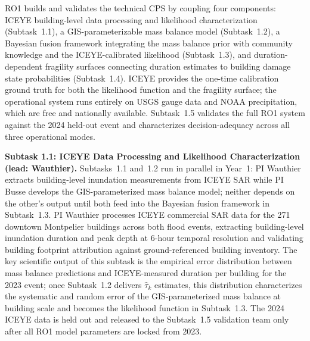 \documentclass[11pt]{article}
\begin{document}
RO1 builds and validates the technical CPS by coupling four components: ICEYE
building-level data processing and likelihood characterization (Subtask~1.1), a
GIS-parameterizable mass balance model (Subtask~1.2), a Bayesian fusion framework
integrating the mass balance prior with community knowledge and the ICEYE-calibrated
likelihood (Subtask~1.3), and duration-dependent fragility surfaces connecting
duration estimates to building damage state probabilities (Subtask~1.4).
ICEYE provides the one-time calibration ground truth for both the likelihood function
and the fragility surface; the operational system runs entirely on USGS gauge data
and NOAA precipitation, which are free and nationally available.
Subtask~1.5 validates the full RO1 system against the 2024 held-out event and
characterizes decision-adequacy across all three operational modes.

\textbf{Subtask 1.1: ICEYE Data Processing and Likelihood Characterization
(lead: Wauthier).}
Subtasks~1.1 and~1.2 run in parallel in Year~1: PI Wauthier extracts
building-level inundation measurements from ICEYE SAR while PI Busse develops
the GIS-parameterized mass balance model; neither depends on the other's output
until both feed into the Bayesian fusion framework in Subtask~1.3.
PI Wauthier processes ICEYE commercial SAR data for the 271 downtown Montpelier
buildings across both flood events, extracting building-level inundation duration
and peak depth at 6-hour temporal resolution and validating building footprint
attribution against ground-referenced building inventory.
The key scientific output of this subtask is the empirical error distribution
between mass balance predictions and ICEYE-measured duration per building for
the 2023 event; once Subtask~1.2 delivers $\hat{\tau}_k$ estimates, this
distribution characterizes the systematic and random error of the
GIS-parameterized mass balance at building scale and becomes the likelihood
function in Subtask~1.3.
The 2024 ICEYE data is held out and released to the Subtask~1.5 validation team
only after all RO1 model parameters are locked from 2023.
\end{document}
